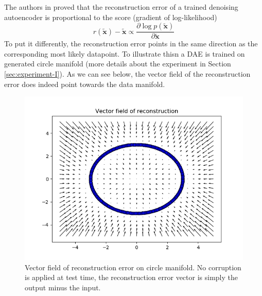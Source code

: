 The authors in \citep{alainbengio} proved that the reconstruction error of a trained denoising autoencoder is proportional to the score (gradient of log-likelihood)
\begin{equation}
r(\tilde{\mathbf{x}}) - \tilde{\mathbf{x}} \propto \frac{\partial \log p(\tilde{\mathbf{x}})}{\partial \tilde{\mathbf{x}}} 
\label{eq:score-reconstruction}
\end{equation} 
To put it differently, the reconstruction error points in the same direction as the corresponding most likely datapoint. To illustrate thisn a DAE is trained on generated circle manifold (more details about the experiment in Section \ref{sec:experiment-I}). As we can see below, the vector field of the reconstruction error does indeed point towards the data manifold.
\begin{figure}[!h]
\centering
\includegraphics[scale=0.6]{figures/circle-vector-field}
\caption[Vector field circle manifold]{Vector field of reconstruction error on circle manifold. No corruption is applied at test time, the reconstruction error vector is simply the output minus the input.}
\label{fig:vf-circle}
\end{figure}

